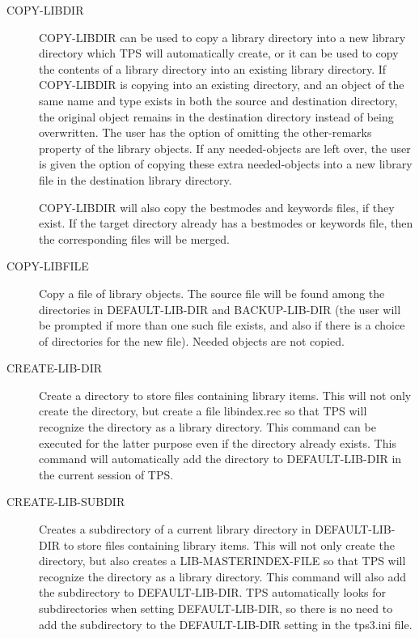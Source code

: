 \begin{description} 
\item[COPY-LIBDIR]  
COPY-LIBDIR can be used to copy a library directory into a
new library directory which TPS will automatically create,
or it can be used to copy the contents of a library directory into
an existing library directory.  If COPY-LIBDIR is copying into
an existing directory, and an object of the same name and type
exists in both the source and destination directory, the original
object remains in the destination directory instead of being overwritten.
The user has the option of omitting the other-remarks property
of the library objects.  If any needed-objects are left over,
the user is given the option of copying these extra needed-objects
into a new library file in the destination library directory.

COPY-LIBDIR will also copy the bestmodes and keywords files, if they
exist.  If the target directory already has a bestmodes or keywords
file, then the corresponding files will be merged.

\item[COPY-LIBFILE]  
Copy a file of library objects. The source file will
be found among the directories in DEFAULT-LIB-DIR and BACKUP-LIB-DIR
(the user will be prompted if more than one such file exists, and also
if there is a choice of directories for the new file).
Needed objects are not copied.

\item[CREATE-LIB-DIR]  
Create a directory to store files containing library items.
This will not only create the directory, but create a file libindex.rec
so that TPS will recognize the directory as a library directory.
This command can be executed for the latter purpose even if the
directory already exists. 
This command will automatically add the directory to DEFAULT-LIB-DIR in
the current session of TPS.

\item[CREATE-LIB-SUBDIR]  
Creates a subdirectory of a current library directory
in DEFAULT-LIB-DIR to store files containing library items.
This will not only create the directory, but also creates a
LIB-MASTERINDEX-FILE so that TPS will recognize the directory as a 
library directory.  This command will also add the subdirectory to
DEFAULT-LIB-DIR.  TPS automatically looks for subdirectories when setting
DEFAULT-LIB-DIR, so there is no need to add the subdirectory to
the DEFAULT-LIB-DIR setting in the tps3.ini file.


\end{description}
